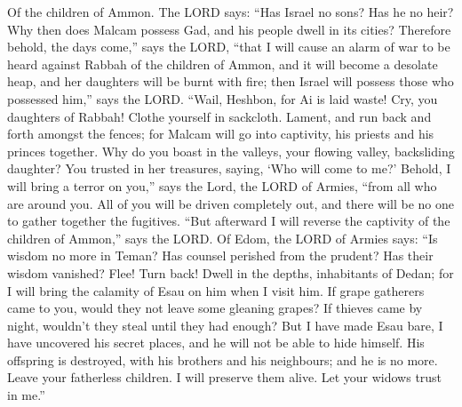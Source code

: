  Of the children of Ammon. The LORD says: ``Has Israel no
sons? Has he no heir? Why then does Malcam possess Gad, and his people
dwell in its cities?  Therefore behold, the days come,''
says the LORD, ``that I will cause an alarm of war to be heard against
Rabbah of the children of Ammon, and it will become a desolate heap, and
her daughters will be burnt with fire; then Israel will possess those
who possessed him,'' says the LORD.  ``Wail, Heshbon, for
Ai is laid waste! Cry, you daughters of Rabbah! Clothe yourself in
sackcloth. Lament, and run back and forth amongst the fences; for Malcam
will go into captivity, his priests and his princes together.
 Why do you boast in the valleys, your flowing valley,
backsliding daughter? You trusted in her treasures, saying, `Who will
come to me?'  Behold, I will bring a terror on you,'' says
the Lord, the LORD of Armies, ``from all who are around you. All of you
will be driven completely out, and there will be no one to gather
together the fugitives.  ``But afterward I will reverse
the captivity of the children of Ammon,'' says the LORD. 
Of Edom, the LORD of Armies says: ``Is wisdom no more in Teman? Has
counsel perished from the prudent? Has their wisdom vanished?
 Flee! Turn back! Dwell in the depths, inhabitants of
Dedan; for I will bring the calamity of Esau on him when I visit him.
 If grape gatherers came to you, would they not leave some
gleaning grapes? If thieves came by night, wouldn't they steal until
they had enough?  But I have made Esau bare, I have
uncovered his secret places, and he will not be able to hide himself.
His offspring is destroyed, with his brothers and his neighbours; and he
is no more.  Leave your fatherless children. I will
preserve them alive. Let your widows trust in me.''

